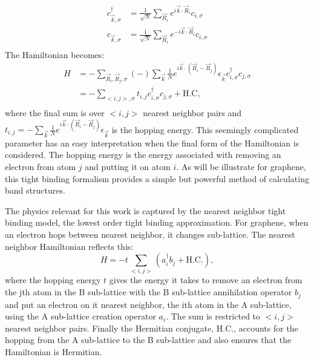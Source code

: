 \begin{align*}
	c^{\dagger}_{\vec{k},\sigma}&=\frac{1}{\sqrt{N}}\sum_{\vec{R}_i} e^{ i \vec{k} \cdot \vec{R}_i} c_{i,\sigma} \\
	c          _{\vec{k},\sigma}&=\frac{1}{\sqrt{N}}\sum_{\vec{R}_i} e^{-i \vec{k} \cdot \vec{R}_i} c_{i,\sigma} \\
\end{align*}
The Hamiltonian becomes:
\begin{align*}
	H&=-\sum_{\vec{R}_i, \vec{R}_j,\sigma} (-) \sum_{\vec{k}}\frac{1}{N} e^{i \vec{k} \cdot (\vec{R}_i-\vec{R}_j)}
	 \epsilon_{\vec{k}} c^{\dagger}_{i,\sigma} c_{j,\sigma} \\
	 &=-\sum_{<i,j>,\sigma} t_{i,j} c^{\dagger}_{i,\sigma} c_{j,\sigma} + \text{H.C},\\
\end{align*}
where the final sum is over $<i,j>$ nearest neighbor pairs and $t_{i,j}=-\sum_{\vec{k}}\frac{1}{N} e^{i \vec{k} \cdot (\vec{R}_i-\vec{R}_j)}\epsilon_{\vec{k}}$ is the hopping energy.
This seemingly complicated parameter has an easy interpretation when the final form of the Hamiltonian is considered.
The hopping energy is the energy associated with removing an electron from atom $j$ and putting it on atom $i$.
As will be illustrate for graphene, this tight binding formalism provides a simple but powerful method of calculating band structures.

The physics relevant for this work is captured by the nearest neighbor tight binding model, the lowest order tight binding approximation.
For graphene, when an electron hops between nearest neighbor, it changes sub-lattice.
The nearest neighbor Hamiltonian reflects this:
\begin{equation*}
	H=-t \sum_{<i,j>} (a_i^{\dagger} b_j + \text{H.C.}),
\end{equation*}
where the hopping energy $t$ gives the energy it takes to remove an electron from the jth atom in the B sub-lattice with the B sub-lattice annihilation operator $b_j$ and put an electron on it nearest neighbor, the ith atom in the A sub-lattice, using the A sub-lattice creation operator $a_i$.
The sum is restricted to $<i,j>$ nearest neighbor pairs.
Finally the Hermitian conjugate, $\text{H.C.}$, accounts for the hopping from the A sub-lattice to the B sub-lattice and also ensures that the Hamiltonian is Hermitian.

